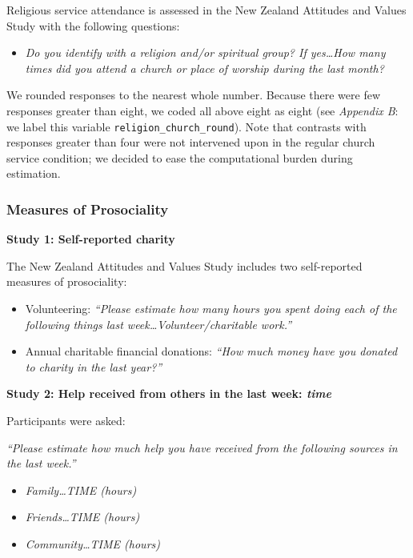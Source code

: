 \documentclass[
  single column]{article}
\providecommand{\tightlist}{%
  \setlength{\itemsep}{0pt}\setlength{\parskip}{0pt}}\usepackage{longtable,booktabs,array}
\begin{document}
Religious service attendance is assessed in the New Zealand Attitudes
and Values Study with the following questions:

\begin{itemize}
\tightlist
\item
  \emph{Do you identify with a religion and/or spiritual group? If
  yes\ldots How many times did you attend a church or place of worship
  during the last month?}
\end{itemize}

We rounded responses to the nearest whole number. Because there were few
responses greater than eight, we coded all above eight as eight (see
\emph{Appendix B}: we label this variable
\texttt{religion\_church\_round}). Note that contrasts with responses
greater than four were not intervened upon in the regular church service
condition; we decided to ease the computational burden during
estimation.

\subsubsection{Measures of Prosociality}\label{measures-of-prosociality}

\textbf{Study 1: Self-reported charity}

The New Zealand Attitudes and Values Study includes two self-reported
measures of prosociality:

\begin{itemize}
\item
  Volunteering: \emph{``Please estimate how many hours you spent doing
  each of the following things last week\ldots Volunteer/charitable
  work.''}
\item
  Annual charitable financial donations: \emph{``How much money have you
  donated to charity in the last year?''}
\end{itemize}

\textbf{Study 2: Help received from others in the last week: \emph{time}
}

Participants were asked:

\emph{``Please estimate how much help you have received from the
following sources in the last week.''}

\begin{itemize}
\tightlist
\item
  \emph{Family\ldots TIME (hours)}
\item
  \emph{Friends\ldots TIME (hours)}
\item
  \emph{Community\ldots TIME (hours)}
\end{itemize}
\end{document}
